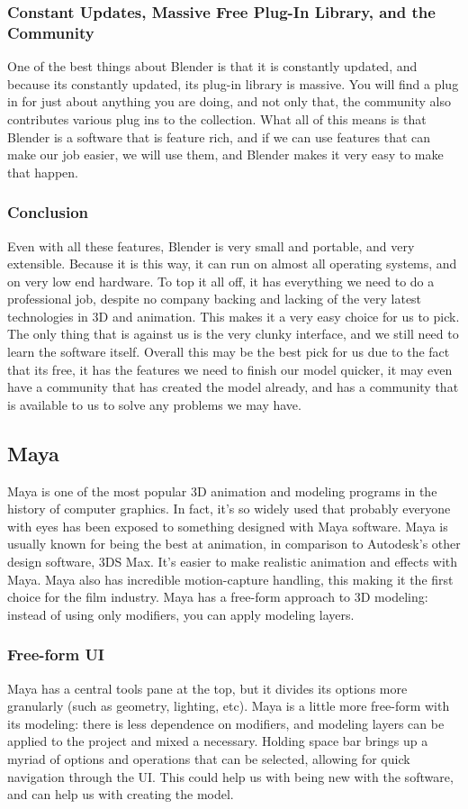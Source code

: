 \documentclass[onecolumn, draftclsnofoot,10pt, compsoc]{IEEEtran}
\begin{document}
\subsubsection{Constant Updates, Massive Free Plug-In Library, and the Community}
One of the best things about Blender is that it is constantly updated, and because its constantly updated, its plug-in library is massive. You will find a plug in for just about anything you are doing, and not only that, the community also contributes various plug ins to the collection. What all of this means is that Blender is a software that is feature rich, and if we can use features that can make our job easier, we will use them, and Blender makes it very easy to make that happen. 
\subsubsection{Conclusion}
Even with all these features, Blender is very small and portable, and very extensible. Because it is this way, it can run on almost all operating systems, and on very low end hardware. To top it all off, it has everything we need to do a professional job, despite no company backing and lacking of the very latest technologies in 3D and animation. This makes it a very easy choice for us to pick. The only thing that is against us is the very clunky interface, and we still need to learn the software itself. Overall this may be the best pick for us due to the fact that its free, it has the features we need to finish our model quicker, it may even have a community that has created the model already, and has a community that is available to us to solve any problems we may have. 
\subsection{Maya}
Maya is one of the most popular 3D animation and modeling programs in the history of computer graphics. In fact, it’s so widely used that probably everyone with eyes has been exposed to something designed with Maya software. Maya is usually known for being the best at animation, in comparison to Autodesk's other design software, 3DS Max. It's easier to make realistic animation and effects with Maya. Maya also has incredible motion-capture handling, this making it the first choice for the film industry. Maya has a free-form approach to 3D modeling: instead of using only modifiers, you can apply modeling layers.
\subsubsection{Free-form UI}
Maya has a central tools pane at the top, but it divides its options more granularly (such as geometry, lighting, etc).  Maya is a little more free-form with its modeling: there is less dependence on modifiers, and modeling layers can be applied to the project and mixed a necessary. Holding space bar brings up a myriad of options and operations that can be selected, allowing for quick navigation through the UI. This could help us with being new with the software, and can help us with creating the model. 
\end{document}
